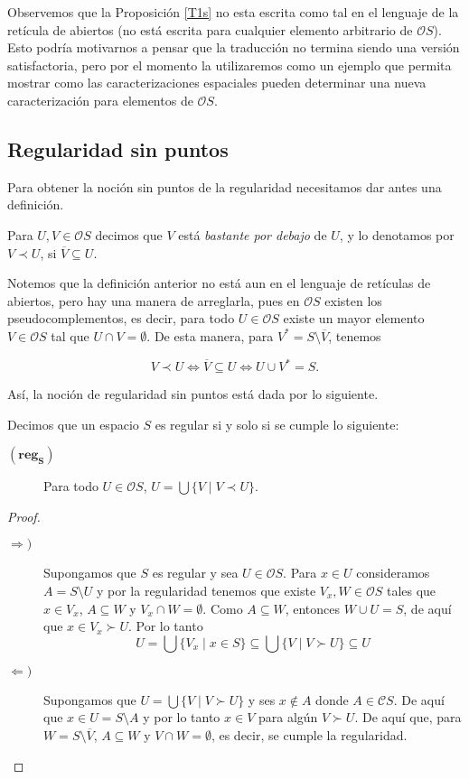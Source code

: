 \documentclass{comunicaciones}
\begin{document}
Observemos que la Proposición \ref{T1s} no esta escrita como tal en el lenguaje de la retícula de abiertos (no está escrita para cualquier elemento arbitrario de $\mathcal{O}S$). Esto podría motivarnos a pensar que la traducción no termina siendo una versión satisfactoria, pero por el momento la utilizaremos como un ejemplo que permita mostrar como las caracterizaciones espaciales pueden determinar una nueva caracterización para elementos de $\mathcal{O}S$.
\subsection{Regularidad sin puntos}

Para obtener la noción sin puntos de la regularidad necesitamos dar antes una definición.

\begin{dfn}\label{Bdebajo}
    Para $U, V\in \mathcal{O}S$ decimos que $V$ está \emph{bastante por debajo} de $U$, y lo denotamos por $V\prec U$, si $\overline{V}\subseteq U$.
\end{dfn}

Notemos que la definición anterior no está aun en el lenguaje de retículas de abiertos, pero hay una manera de arreglarla, pues en $\mathcal{O}S$ existen los pseudocomplementos, es decir, para todo $U\in \mathcal{O}S$ existe un mayor elemento $V\in \mathcal{O}S$ tal que $U\cap V=\emptyset$. De esta manera, para $V^*=S\setminus \overline{V}$, tenemos

\[
V\prec U \Leftrightarrow \overline{V}\subseteq U\Leftrightarrow U\cup V^*=S.
\]

Así, la noción de regularidad sin puntos está dada por lo siguiente.

\begin{prop}\label{Regs}
    Decimos que un espacio $S$ es regular si y solo si se cumple lo siguiente:
\begin{description}
\item[$(\mathbf{reg_S})$] Para todo  $U\in \mathcal{O}S$, $U=\bigcup\{V\mid V\prec U\}$.
\end{description}
\end{prop}

\begin{proof}
    \begin{description}
        \item[$\Rightarrow )$] Supongamos que $S$ es regular y sea $U\in \mathcal{O}S$. Para $x\in U$ consideramos $A=S\setminus U$ y por la regularidad tenemos que existe $V_x, W\in \mathcal{O}S $ tales que $x\in V_x$, $A\subseteq W$ y $V_x\cap W=\emptyset$. Como $A\subseteq W$, entonces $W\cup U=S$, de aquí que $x\in V_x\succ U$. Por lo tanto 
        \[
        U=\bigcup\{V_x\mid x\in S\}\subseteq \bigcup\{V\mid V\succ U\}\subseteq U
        \]
        \item[$\Leftarrow )$] Supongamos que $U=\bigcup\{V\mid V\succ U\}$ y ses $x\notin A$ donde $A\in \mathcal{C}S$. De aquí que $x\in U=S\setminus A$ y por lo tanto $x\in V$ para algún $V\succ U$. De aquí que, para $W=S\setminus \overline{V}$, $A\subseteq W$ y $V\cap W=\emptyset$, es decir, se cumple la regularidad. 
    \end{description}
\end{proof}
\end{document}
